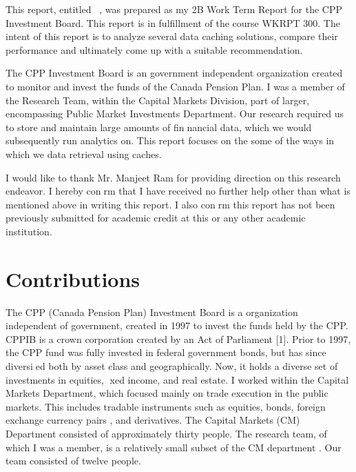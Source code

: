 \documentclass[ece]{uw-wkrpt}
\begin{document}
\begin{letter}


This report, entitled \thetitle\ , was prepared as my 2B Work Term Report for the CPP Investment
Board. This report is in fulfillment of the course WKRPT 300. The intent of this report is to analyze
several data caching solutions, compare their performance and ultimately come up with a suitable recommendation.

The CPP Investment Board is an government independent organization created
to monitor and invest the funds of the Canada Pension Plan.
I was a member of the Research Team, within the Capital Markets Division,
part of larger, encompassing Public Market Investments Department. Our research
required us to store and maintain large amounts of finnancial data, which we would
subsequently run analytics on. This report focuses on the some of the ways in which we data retrieval 
using caches. 

I would like to thank Mr. Manjeet Ram for providing direction on this research
endeavor. I hereby conrm that I have received no further help other than what
is mentioned above in writing this report. I also conrm this report has not been
previously submitted for academic credit at this or any other academic institution.

\end{letter}

\section{Contributions}

The CPP (Canada Pension Plan) Investment Board is a organization independent of
government, created in 1997 to invest the funds held by the CPP. CPPIB is a crown
corporation created by an Act of Parliament [1]. Prior to 1997, the CPP fund was
fully invested in federal government bonds, but has since diversied both by asset
class and geographically. Now, it holds a diverse set of investments in equities, xed
income, and real estate. I worked within the Capital Markets Department, which
focused mainly on trade execution in the public markets. This includes tradable
instruments such as equities, bonds, foreign exchange currency pairs , and derivatives.
The Capital Markets (CM) Department consisted of approximately thirty people. The
research team, of which I was a member, is a relatively small subset of the CM
department . Our team consisted of twelve people.
\end{document}
